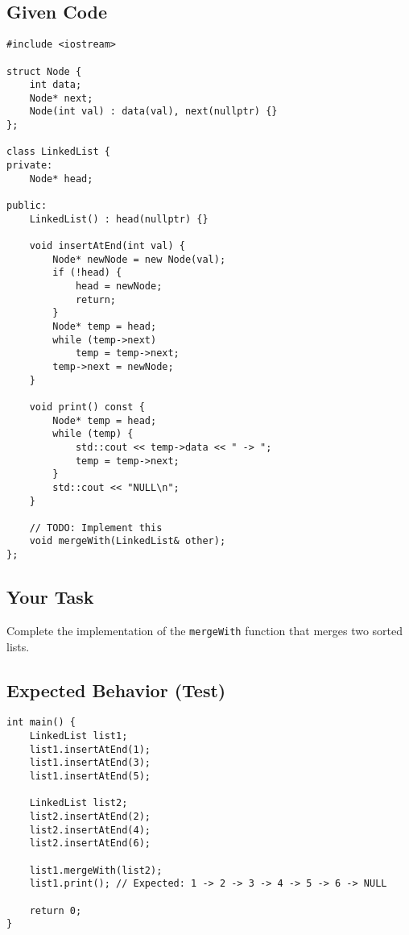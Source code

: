 \documentclass{article}
\begin{document}
\subsection*{Given Code}

\begin{lstlisting}[style=cppstyle]
#include <iostream>

struct Node {
    int data;
    Node* next;
    Node(int val) : data(val), next(nullptr) {}
};

class LinkedList {
private:
    Node* head;

public:
    LinkedList() : head(nullptr) {}

    void insertAtEnd(int val) {
        Node* newNode = new Node(val);
        if (!head) {
            head = newNode;
            return;
        }
        Node* temp = head;
        while (temp->next)
            temp = temp->next;
        temp->next = newNode;
    }

    void print() const {
        Node* temp = head;
        while (temp) {
            std::cout << temp->data << " -> ";
            temp = temp->next;
        }
        std::cout << "NULL\n";
    }

    // TODO: Implement this
    void mergeWith(LinkedList& other);
};
\end{lstlisting}

\subsection*{Your Task}

Complete the implementation of the \texttt{mergeWith} function that merges two sorted lists.

\subsection*{Expected Behavior (Test)}

\begin{lstlisting}[style=cppstyle]
int main() {
    LinkedList list1;
    list1.insertAtEnd(1);
    list1.insertAtEnd(3);
    list1.insertAtEnd(5);

    LinkedList list2;
    list2.insertAtEnd(2);
    list2.insertAtEnd(4);
    list2.insertAtEnd(6);

    list1.mergeWith(list2);
    list1.print(); // Expected: 1 -> 2 -> 3 -> 4 -> 5 -> 6 -> NULL

    return 0;
}
\end{lstlisting}
\end{document}
